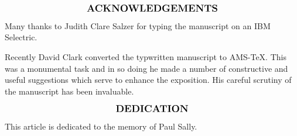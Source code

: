 \[
\text{\large\bf ACKNOWLEDGEMENTS}
\]
\setlength\parindent{2em}




Many thanks to Judith Clare Salzer for typing the manuscript on an IBM Selectric.

Recently David Clark converted the typwritten manuscript to AMS-TeX.  This was a monumental task and in so doing he made a number of constructive and useful suggestions which serve to enhance the exposition.  His careful scrutiny of the manuscript has been invaluable.

\vspace{2 cm}


\[
\text{\large\bf DEDICATION}
\]

This article is dedicated to the memory of Paul Sally.








